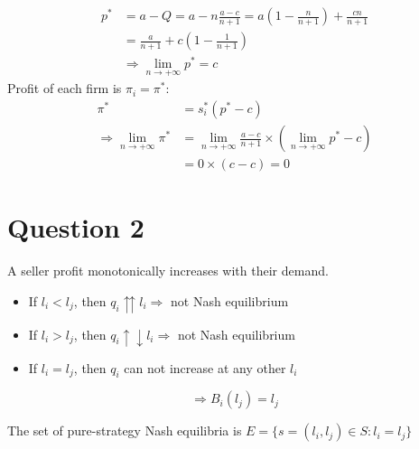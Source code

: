 \documentclass{article}
\begin{document}
\begin{enumerate}
\begin{align*}
      p^* & = a - Q = a - n\frac{a - c}{n + 1} = a \left(1 - \frac{n}{n+1}\right) + \frac{cn}{n + 1} \\
      &= \frac{a}{n+1} + c \left(1 - \frac{1}{n+1}\right) \\
      & \Rightarrow \lim_{n \to +\infty} p^* = c 
    \end{align*}
    Profit of each firm is $\pi_i = \pi^*$:
    \begin{align*}
      \pi^* &= s_i^*(p^* - c) \\
      \Rightarrow \lim_{n \to +\infty} \pi^* &= \lim_{n \to + \infty} \frac{a - c}{n + 1} \times (\lim_{n \to +  \infty} p^* - c) \\
      &= 0 \times (c - c) = 0
    \end{align*}
\end{enumerate}

\section*{Question 2} 
A seller profit monotonically increases with their demand.
\begin{itemize}
  \item If $l_i < l_j$, then $q_i \upuparrows l_i \Rightarrow$ not Nash equilibrium
  \item If $l_i > l_j$, then $q_i \uparrow \downarrow l_i \Rightarrow$ not Nash equilibrium
  \item If $l_i = l_j$, then $q_i$ can not increase at any other $l_i$
\end{itemize}
\[
  \Rightarrow B_i(l_j) = l_j
\]

The set of pure-strategy Nash equilibria is $E = \{s = (l_i, l_j) \in S: l_i = l_j\}$
\end{document}
